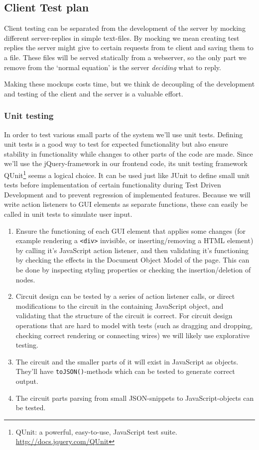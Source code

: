 \subsection{Client Test plan}
Client testing can be separated from the development of the server by mocking different server-replies in simple text-files. By mocking we mean creating test replies the server might give to certain requests from te client and saving them to a file. These files will be served statically from a webserver, so the only part we remove from the `normal equation' is the server \textit{deciding} what to reply.

Making these mockups costs time, but we think de decoupling of the development and testing of the client and the server is a valuable effort.

\subsubsection{Unit testing}
In order to test various small parts of the system we'll use unit tests. Defining unit tests is a good way to test for expected functionality but also ensure stability in functionality while changes to other parts of the code are made. Since we'll use the jQuery-framework in our frontend code, its unit testing framework QUnit\footnote{QUnit: a powerful, easy-to-use, JavaScript test suite. \url{http://docs.jquery.com/QUnit}} seems a logical choice. It can be used just like JUnit to define small unit tests before implementation of certain functionality during Test Driven Development and to prevent regression of implemented features. Because we will write action listeners to GUI elements as separate functions, these can easily be called in unit tests to simulate user input.
\begin{enumerate}
\item Ensure the functioning of each GUI element that applies some changes (for example rendering a \verb-<div>- invisible, or inserting/removing a HTML element) by calling it's JavaScript action listener, and then validating it's functioning by checking the effects in the Document Object Model of the page. This can be done by inspecting styling properties or checking the insertion/deletion of nodes.
\item Circuit design can be tested by a series of action listener calls, or direct modifications to the circuit in the containing JavaScript object, and validating that the structure of the circuit is correct.
For circuit design operations that are hard to model with tests (such as dragging and dropping, checking correct rendering or connecting wires) we will likely use explorative testing.\item The circuit and the smaller parts of it will exist in JavaScript as objects. They'll have \verb|toJSON()|-methods which can be tested to generate correct output.
\item The circuit parts parsing from small JSON-snippets to JavaScript-objects can be tested.
\end{enumerate}

